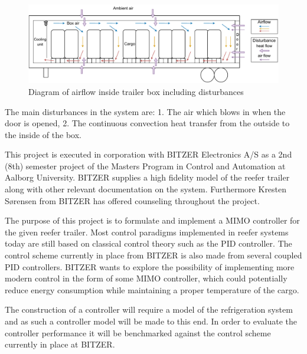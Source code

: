 \begin{figure}[h]
	\centering
	\includegraphics[width = 0.8\linewidth]{Graphics/Trailer_airflow.pdf}
	\caption{Diagram of airflow inside trailer box including disturbances}
	\label{fig:trailer_airflow}
\end{figure}

The main disturbances in the system are: 1. The air which blows in when the door is opened, 2. The continuous convection heat transfer from the outside to the inside of the box.

This project is executed in corporation with BITZER Electronics A/S as a 2nd (8th) semester project of the Masters Program in Control and Automation at Aalborg University. BITZER supplies a high fidelity model of the reefer trailer along with other relevant documentation on the system. Furthermore Kresten Sørensen from BITZER has offered counseling throughout the project.

The purpose of this project is to formulate and implement a MIMO controller for the given reefer trailer. Most control paradigms implemented in reefer systems today are still based on classical control theory such as the PID controller. The control scheme currently in place from BITZER is also made from several coupled PID controllers. BITZER wants to explore the possibility of implementing more modern control in the form of some MIMO controller, which could potentially reduce energy consumption while maintaining a proper temperature of the cargo.

The construction of a controller will require a model of the refrigeration system and as such a controller model will be made to this end. In order to evaluate the controller performance it will be benchmarked against the control scheme currently in place at BITZER.
